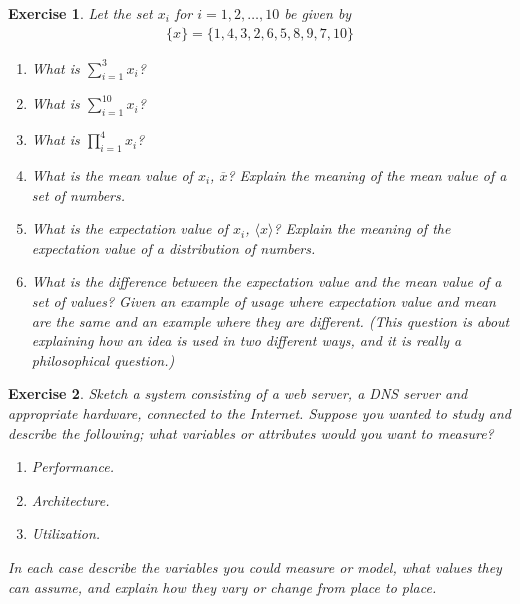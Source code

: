 \documentclass{book}
\newtheorem{exercise}{Exercise}
\def\beq{\begin{eqnarray}}
\def\eeq{\end{eqnarray}}
\begin{document}
\begin{exercise}
Let the set $x_i$ for $i=1,2,\ldots,10$ be given by
\beq
\{ x\} = \{1,4,3,2,6,5,8,9,7,10\}
\eeq
\begin{enumerate}
\item What is $\sum_{i=1}^3 x_i$?
\item What is $\sum_{i=1}^{10} x_i$?
\item What is $\prod_{i=1}^4 x_i$?
\item What is the mean value of $x_i$, $\overline x$? Explain the meaning of the mean value of a set of numbers.
\item What is the expectation value of $x_i$, $\langle x\rangle$? Explain the meaning of the expectation value of a distribution of numbers.
\item What is the difference between the expectation value and the mean 
value of a set of values?
Given an example of usage where expectation value and
mean are the same and an example where they are different. (This question is about explaining
how an idea is used in two different ways, and it is really a philosophical question.)
\end{enumerate}
\end{exercise}
\begin{solution}
\end{solution}


\begin{exercise}
Sketch a system consisting of a web server, a DNS server and appropriate hardware,
connected to the Internet. Suppose you wanted to study and describe the following; what variables
or attributes would you want to measure?
\begin{enumerate}
\item Performance.
\item Architecture.
\item Utilization.
\end{enumerate}
In each case describe the variables you could measure or model, what values they
can assume, and explain how they 
vary or change from place to place.
\end{exercise}
\begin{solution}
\end{solution}
\end{document}
